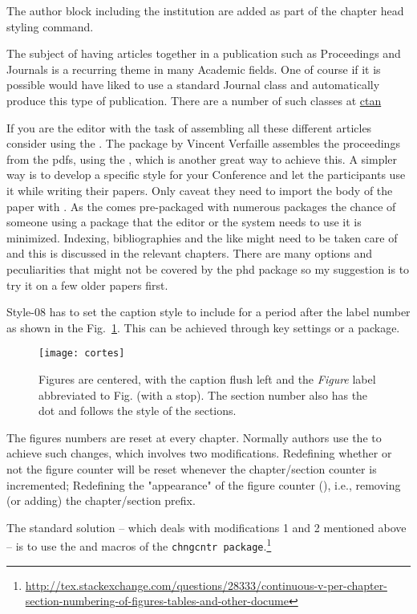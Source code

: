 The author block including the institution are added as part of the chapter head styling command.

\example The subject of having articles together in a publication such as Proceedings and Journals is a recurring theme in many Academic fields. One of course if it is possible would have liked to use a standard Journal class and automatically produce this type of publication. There are a number of such classes at \href{http://ctan.org/tex-archive/macros/latex/required/amslatex/amscls/doc/instr-l.pdf}{ctan}

\solution If you are the editor with the task of assembling all these different articles consider using the . The package by Vincent Verfaille assembles the proceedings from the pdfs, using the 
, which is another great way to achieve this. A simpler way is to develop a specific style for
your Conference and let the participants use it while writing their papers. Only caveat they need to import the
body of the paper with \string{}. As the  comes pre-packaged with
numerous packages the chance of someone using a package that the editor or the system needs to use it
is minimized. Indexing, bibliographies and the like might need to be taken care of and this is discussed in the relevant chapters. There are many options and peculiarities that might not be covered by the phd package so my suggestion is to try it on a few older papers first.

\example  Style-08 has to set the caption style to include for a period after the label number as shown in the Fig.~\ref{fig:eight02}. This can be achieved through key settings or a package.
\begin{figure}[ht]
\centering
\texttt{[image: cortes]}
\caption{Figures are centered, with the caption flush left and the \textit{Figure} label abbreviated to Fig. (with a stop). The section number also has the dot and follows the style of the sections.}
\label{fig:eight02}
\end{figure}

The figures numbers are reset at every chapter. Normally authors use the  to achieve such changes, which involves two modifications. Redefining whether or not the figure counter will be reset whenever the chapter/section counter is incremented; Redefining the "appearance" of the figure counter (\string\thefigure), i.e., removing (or adding) the chapter/section prefix.


The standard solution – which deals with modifications 1 and 2 mentioned above – is to use the \string\counterwithout and \string\counterwithin macros of the \texttt{chngcntr package}.\footnote{\protect\url{http://tex.stackexchange.com/questions/28333/continuous-v-per-chapter-section-numbering-of-figures-tables-and-other-docume}} 


